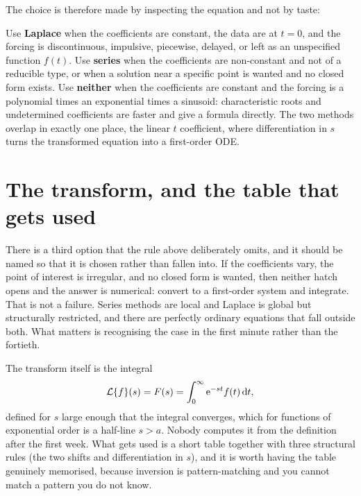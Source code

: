 The choice is therefore made by inspecting the equation and not by taste:

\begin{keynote}
Use \textbf{Laplace} when the coefficients are constant, the data are at $t=0$, and the forcing is discontinuous, impulsive, piecewise, delayed, or left as an unspecified function $f(t)$. Use \textbf{series} when the coefficients are non-constant and not of a reducible type, or when a solution near a specific point is wanted and no closed form exists. Use \textbf{neither} when the coefficients are constant and the forcing is a polynomial times an exponential times a sinusoid: characteristic roots and undetermined coefficients are faster and give a formula directly. The two methods overlap in exactly one place, the linear $t$ coefficient, where differentiation in $s$ turns the transformed equation into a first-order ODE.
\end{keynote}

\section{The transform, and the table that gets used}

There is a third option that the rule above deliberately omits, and it should be named so that it is chosen rather than fallen into. If the coefficients vary, the point of interest is irregular, and no closed form is wanted, then neither hatch opens and the answer is numerical: convert to a first-order system and integrate. That is not a failure. Series methods are local and Laplace is global but structurally restricted, and there are perfectly ordinary equations that fall outside both. What matters is recognising the case in the first minute rather than the fortieth.

The transform itself is the integral
\[\mathcal{L}\{f\}(s)=F(s)=\int_0^{\infty}\mathrm{e}^{-st}f(t)\,\mathrm{d} t,\]
defined for $s$ large enough that the integral converges, which for functions of exponential order is a half-line $s>a$. Nobody computes it from the definition after the first week. What gets used is a short table together with three structural rules (the two shifts and differentiation in $s$), and it is worth having the table genuinely memorised, because inversion is pattern-matching and you cannot match a pattern you do not know.

